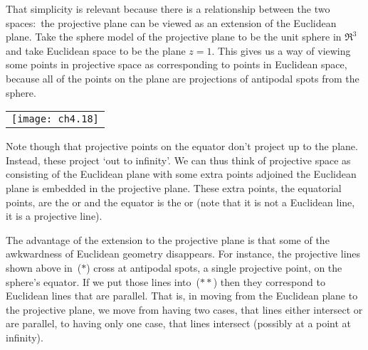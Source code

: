 That simplicity is relevant because there is a 
relationship between the two spaces:~the 
projective plane can be viewed as an extension of the Euclidean plane.
Take the sphere model of the projective plane to be the unit sphere in $\Re^3$
and take Euclidean space to be the plane $z=1$.
This gives us a way of viewing some points
in projective space as corresponding to points in Euclidean space,
because all of the points on the plane are projections of  
antipodal spots from the sphere.
\begin{center}
 \hfill
  \begin{tabular}{@{}c@{}}\texttt{[image: ch4.18]}\end{tabular}
 \hfill\llap{($**$)}
\end{center}
Note though that projective points on the equator don't project up to the 
plane.
Instead, these project `out to infinity'.
We can thus think of projective space as consisting of the Euclidean plane 
with some extra points adjoined \Dash  
the Euclidean plane is embedded in the projective plane.
These extra points, the equatorial points, are  
the %
or 
and the equator is the 
%
 or 
(note that it is not a Euclidean line, it is a projective line). 

The advantage of the extension to the projective plane
is that some of the awkwardness 
of Euclidean geometry disappears.
For instance, the projective lines shown above in~($*$) cross
at antipodal spots, a single projective point, on the sphere's equator.
If we put those lines into~($**$) then they correspond to Euclidean lines that
are parallel.
That is, in moving from the Euclidean plane to the projective plane, we move
from having two cases, 
that lines either intersect or are parallel, to having only
one case, that lines intersect (possibly at a point at infinity). 

